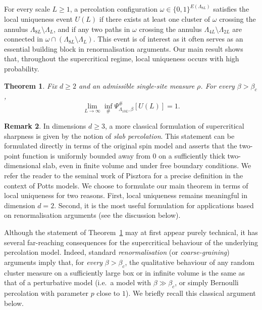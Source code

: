 \documentclass[11pt,a4paper]{article}
\numberwithin{equation}{section}
\theoremstyle{plain}
\newtheorem{Thm}{Theorem}[section]
\theoremstyle{definition}
\newtheorem{Rem}[Thm]{Remark}
\begin{document}
For every scale $L\geq1$, a percolation configuration $\omega\in \{0,1\}^{E(\Lambda_{8L})}$ satisfies the local uniqueness event $U(L)$  if there exists at least one cluster of $\omega$ crossing the annulus $\Lambda_{8L}\setminus \Lambda_L$, and if any two paths in $\omega$ crossing the annulus $\Lambda_{4L}\setminus \Lambda_{2L}$ are connected in $\omega\cap(\Lambda_{8L}\setminus \Lambda_L)$. This event is of interest as it often serves as an essential building block 
in renormalisation arguments. Our main result shows that, throughout the supercritical regime, local uniqueness occurs with high probability.

\begin{Thm}\label{thm:main} Fix $d\geq 2$ and an admissible single-site measure $\rho$. For every $\beta>\beta_c$,
\begin{equation}\label{eq:local_uniqueness}
\lim_{L\to\infty} \inf_{\#}\Psi^{\#}_{\Lambda_{10L},\beta}[U(L)] = 1.   
\end{equation}
\end{Thm}

\begin{Rem}
	In dimensions $d\geq 3$, a more classical formulation of supercritical sharpness is given by the notion of \emph{slab percolation}. This statement can be formulated directly in terms of the original spin model and asserts that the two-point function is uniformly bounded away from $0$ on a sufficiently thick two-dimensional slab, even in finite volume and under free boundary conditions. We refer the reader to the seminal work of Pisztora \cite{Pisztora96surface} for a precise definition in the context of Potts models. We choose to formulate our main theorem in terms of local uniqueness for two reasons. First, local uniqueness remains meaningful in dimension $d=2$. Second, it is the  most useful  formulation for applications based on renormalisation arguments (see the discussion below).
\end{Rem}

Although the statement of Theorem~\ref{thm:main} may at first appear purely technical, it has several far-reaching consequences for the supercritical behaviour of the underlying percolation model. Indeed, standard \emph{renormalisation} (or \emph{coarse-graining}) arguments imply that, for \emph{every} $\beta>\beta_c$, the qualitative behaviour of any random cluster measure on a sufficiently large box or in infinite volume is the same as that of a perturbative model (i.e.~a model with $\beta\gg\beta_c$, or simply Bernoulli percolation with parameter $p$ close to $1$). We briefly recall this classical argument below.
\end{document}

